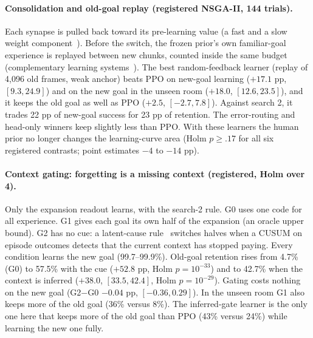 \documentclass[10pt,onecolumn,letterpaper]{article}
\begin{document}
\paragraph{Consolidation and old-goal replay (registered NSGA-II, 144 trials).} Each synapse is pulled back toward its
pre-learning value (a fast and a slow weight component~\cite{benna2016}). Before the switch, the frozen prior's own
familiar-goal experience is replayed between new chunks, counted inside the same budget (complementary learning
systems~\cite{mcclelland1995}). The best random-feedback learner (replay of 4,096 old frames, weak anchor) beats PPO on new-goal learning
($+17.1$ pp, $[9.3,24.9]$) and on the new goal in the unseen room ($+18.0$, $[12.6,23.5]$), and it keeps the old goal as
well as PPO ($+2.5$, $[-2.7,7.8]$). Against search 2, it trades 22 pp of new-goal success for 23 pp of retention. The
error-routing and head-only winners keep slightly less than PPO. With these learners the human prior no longer changes the
learning-curve area (Holm $p\geq.17$ for all six registered contrasts; point estimates $-4$ to $-14$ pp).

\paragraph{Context gating: forgetting is a missing context (registered, Holm over 4).} Only the expansion readout learns,
with the search-2 rule. G0 uses one code for all experience. G1 gives each goal its own half of the expansion (an oracle
upper bound). G2 has no cue: a latent-cause rule~\cite{gershman2010latent} switches halves when a CUSUM on episode outcomes
detects that the current context has stopped paying. Every condition learns the new goal (99.7--99.9\%). Old-goal
retention rises from 4.7\% (G0) to 57.5\% with the cue ($+52.8$ pp, Holm $p=10^{-33}$) and to 42.7\% when the context is
inferred ($+38.0$, $[33.5,42.4]$, Holm $p=10^{-29}$). Gating costs nothing on the new goal (G2$-$G0 $-0.04$ pp,
$[-0.36,0.29]$). In the unseen room G1 also keeps more of the old goal (36\% versus 8\%). The inferred-gate learner is
the only one here that keeps more of the old goal than PPO (43\% versus 24\%) while learning the new one fully.
\end{document}
